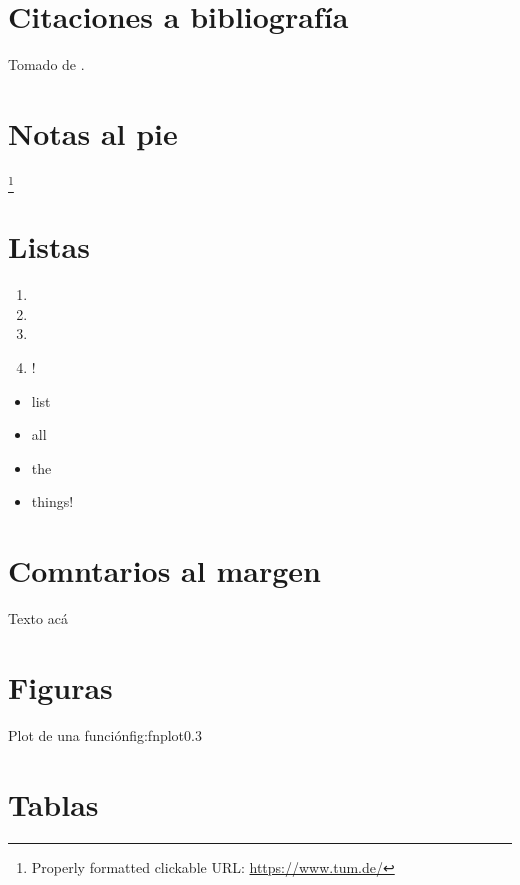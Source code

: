 
\section*{Citaciones a bibliografía}
\tinylipsum Tomado de \cite{latex}.

\section*{Notas al pie}
\tinylipsum \footnote{Properly formatted clickable URL: \url{https://www.tum.de/}}

\section*{Listas}
\tinylipsum

\tinylipsum
\begin{enumerate}
	\item \tinylipsum
	\item \tinylipsum
	\item \tinylipsum
	\item \tinylipsum!
\end{enumerate}

\begin{itemize}
	\item list
	\item all
	\item the
	\item things!
\end{itemize}
\tinylipsum

\section*{Comntarios al margen}
Texto acá 

\section*{Figuras}
\tinylipsum
{}%
{Plot de una función}{fig:fnplot}{0.3}
\tinylipsum

\section*{Tablas}

\tinylipsum


